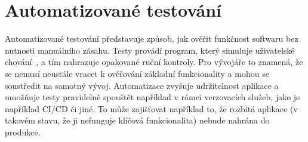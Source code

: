 




\section{Automatizované testování}

Automatizované testování představuje způsob, jak ověřit funkčnost softwaru bez nutnosti manuálního zásahu.
Testy provádí program, který simuluje uživatelské chování~\cite{meszaros_2007}, a tím nahrazuje opakované ruční kontroly.
Pro vývojáře to znamená, že se nemusí neustále vracet k ověřování základní funkcionality a mohou se soustředit na samotný vývoj. 
Automatizace zvyšuje udržitelnost aplikace a umožňuje testy pravidelně spouštět například v rámci verzovacích služeb, jako je například CI/CD či jiné.
To může zajišťovat například to, že rozbitá aplikace (v takovém stavu, že ji nefunguje klíčová funkcionalita) nebude nahrána do produkce.

